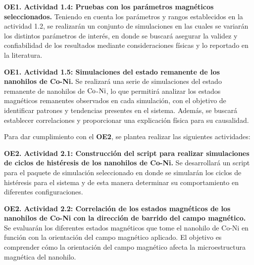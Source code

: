 \vspace{10pt}

\textbf{OE1. Actividad 1.4: Pruebas con los parámetros magnéticos seleccionados.} Teniendo en cuenta los parámetros y rangos establecidos en la actividad 1.2, se realizarán un conjunto de simulaciones en las cuales se variarán los distintos parámetros de interés, en donde se buscará asegurar la validez y confiabilidad de los resultados mediante consideraciones físicas y lo reportado en la literatura.

\vspace{10pt}

\textbf{OE1. Actividad 1.5: Simulaciones del estado remanente de los nanohilos de Co-Ni.} Se realizará una serie de simulaciones del estado remanente de nanohilos de $\ce{Co}$-$\ce{Ni}$, lo que permitirá analizar los estados magnéticos remanentes observados en cada simulación, con el objetivo de identificar patrones y tendencias presentes en el sistema. Además, se buscará establecer correlaciones y proporcionar una explicación física para su causalidad.

\vspace{10pt}

Para dar cumplimiento con el \textbf{OE2}, se plantea realizar las siguientes actividades:

\vspace{10pt}

\textbf{OE2. Actividad 2.1: Construcción del script para realizar simulaciones de ciclos de histéresis de los nanohilos de Co-Ni.} Se desarrollará un script para el paquete de simulación seleccionado en donde se simularán los ciclos de histéresis para el sistema y de esta manera determinar su comportamiento en diferentes configuraciones.

\newpage

\textbf{OE2. Actividad 2.2: Correlación de los estados magnéticos de los nanohilos de Co-Ni con la dirección de barrido del campo magnético.} Se evaluarán los diferentes estados magnéticos que tome el nanohilo de Co-Ni en función con la orientación del campo magnético aplicado. El objetivo es comprender cómo la orientación del campo magnético afecta la microestructura magnética del nanohilo.